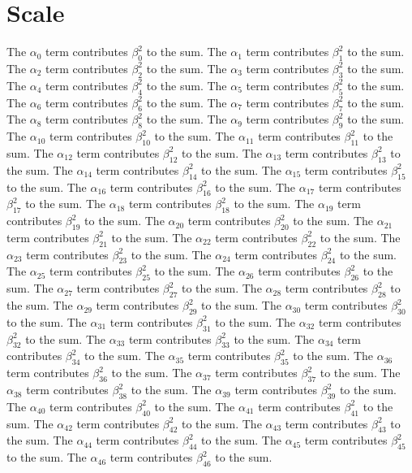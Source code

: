 \section{Scale}\label{hx-0500}

\begin{lemma}\label{hx-0012}
The $\alpha_{0}$ term contributes $\beta_{0}^{2}$ to the sum. The $\alpha_{1}$ term contributes $\beta_{1}^{2}$ to the sum. The $\alpha_{2}$ term contributes $\beta_{2}^{2}$ to the sum. The $\alpha_{3}$ term contributes $\beta_{3}^{2}$ to the sum. The $\alpha_{4}$ term contributes $\beta_{4}^{2}$ to the sum. The $\alpha_{5}$ term contributes $\beta_{5}^{2}$ to the sum. The $\alpha_{6}$ term contributes $\beta_{6}^{2}$ to the sum. The $\alpha_{7}$ term contributes $\beta_{7}^{2}$ to the sum. The $\alpha_{8}$ term contributes $\beta_{8}^{2}$ to the sum. The $\alpha_{9}$ term contributes $\beta_{9}^{2}$ to the sum. The $\alpha_{10}$ term contributes $\beta_{10}^{2}$ to the sum. The $\alpha_{11}$ term contributes $\beta_{11}^{2}$ to the sum. The $\alpha_{12}$ term contributes $\beta_{12}^{2}$ to the sum. The $\alpha_{13}$ term contributes $\beta_{13}^{2}$ to the sum. The $\alpha_{14}$ term contributes $\beta_{14}^{2}$ to the sum. The $\alpha_{15}$ term contributes $\beta_{15}^{2}$ to the sum. The $\alpha_{16}$ term contributes $\beta_{16}^{2}$ to the sum. The $\alpha_{17}$ term contributes $\beta_{17}^{2}$ to the sum. The $\alpha_{18}$ term contributes $\beta_{18}^{2}$ to the sum. The $\alpha_{19}$ term contributes $\beta_{19}^{2}$ to the sum. The $\alpha_{20}$ term contributes $\beta_{20}^{2}$ to the sum. The $\alpha_{21}$ term contributes $\beta_{21}^{2}$ to the sum. The $\alpha_{22}$ term contributes $\beta_{22}^{2}$ to the sum. The $\alpha_{23}$ term contributes $\beta_{23}^{2}$ to the sum. The $\alpha_{24}$ term contributes $\beta_{24}^{2}$ to the sum. The $\alpha_{25}$ term contributes $\beta_{25}^{2}$ to the sum. The $\alpha_{26}$ term contributes $\beta_{26}^{2}$ to the sum. The $\alpha_{27}$ term contributes $\beta_{27}^{2}$ to the sum. The $\alpha_{28}$ term contributes $\beta_{28}^{2}$ to the sum. The $\alpha_{29}$ term contributes $\beta_{29}^{2}$ to the sum. The $\alpha_{30}$ term contributes $\beta_{30}^{2}$ to the sum. The $\alpha_{31}$ term contributes $\beta_{31}^{2}$ to the sum. The $\alpha_{32}$ term contributes $\beta_{32}^{2}$ to the sum. The $\alpha_{33}$ term contributes $\beta_{33}^{2}$ to the sum. The $\alpha_{34}$ term contributes $\beta_{34}^{2}$ to the sum. The $\alpha_{35}$ term contributes $\beta_{35}^{2}$ to the sum. The $\alpha_{36}$ term contributes $\beta_{36}^{2}$ to the sum. The $\alpha_{37}$ term contributes $\beta_{37}^{2}$ to the sum. The $\alpha_{38}$ term contributes $\beta_{38}^{2}$ to the sum. The $\alpha_{39}$ term contributes $\beta_{39}^{2}$ to the sum. The $\alpha_{40}$ term contributes $\beta_{40}^{2}$ to the sum. The $\alpha_{41}$ term contributes $\beta_{41}^{2}$ to the sum. The $\alpha_{42}$ term contributes $\beta_{42}^{2}$ to the sum. The $\alpha_{43}$ term contributes $\beta_{43}^{2}$ to the sum. The $\alpha_{44}$ term contributes $\beta_{44}^{2}$ to the sum. The $\alpha_{45}$ term contributes $\beta_{45}^{2}$ to the sum. The $\alpha_{46}$ term contributes $\beta_{46}^{2}$ to the sum. 
\end{lemma}
